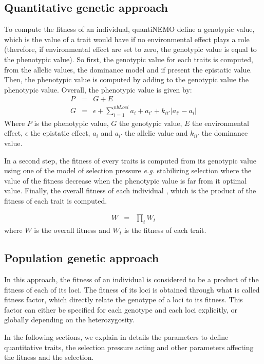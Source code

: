 \documentclass[letterpaper,12pt,oneside]{book}
\begin{document}
\subsection{Quantitative genetic approach}
To compute the fitness of an individual, quantiNEMO define a genotypic value, which is the value of a trait would have if no environmental effect plays a role (therefore, if environmental effect are set to zero, the genotypic value is equal to the phenotypic value). So first, the genotypic value for each traits is computed, from the allelic values, the dominance model and if present the epistatic value. Then, the phenotypic value is computed by adding to the genotypic value the phenotypic value. Overall, the phenotypic value is given by:
\begin{eqnarray}
P &=& G + E \\
G&=&\epsilon+\sum_{i=1}^{nbLoci}a_i+a_{i'}+k_{ii'}|a_{i'}-a_i| 
\end{eqnarray}
Where $P$ is the phenotypic value, $G$ the genotypic value, $E$ the environmental effect, $\epsilon$ the epistatic effect, $a_i$ and $a_{i'}$ the allelic value and $k_{ii'}$ the dominance value. 

In a second step, the fitness of every traits is computed from its genotypic value using one of the model of selection pressure \textit{e.g.} stabilizing selection where the value of the fitness decrease when the phenotypic value is far from it optimal value. Finally, the overall fitness of each individual , which is the product of the fitness of each trait is computed.

\begin{eqnarray}
W &=& \prod_t W_t
\end{eqnarray}
where $W$ is the overall fitness and $W_t$ is the fitness of each trait. 
\subsection{Population genetic approach}
In this approach, the fitness of an individual is considered to be a product of the fitness of each of its loci. The fitness of its loci is obtained through what is called fitness factor, which directly relate the genotype of a loci to its fitness. This factor can either be specified for each genotype and each loci explicitly, or globally depending on the heterozygosity.  

In the following sections, we explain in details the parameters to define quantitative traits, the selection pressure acting and other parameters affecting the fitness and the selection. 
\end{document}
